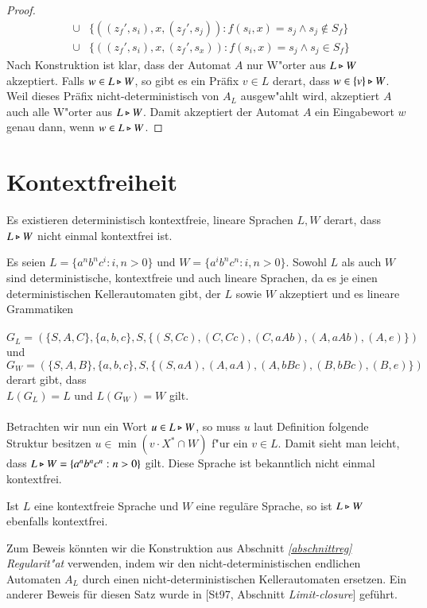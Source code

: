 \begin{proof}
\begin{eqnarray}
 & \cup & \{ ((z_f',s_i),x,(z_f',s_j)) : f(s_i,x)=s_j  \wedge s_j \notin S_f\} \label{auto3}\\
 & \cup & \{ ((z_f',s_i),x,(z_f',s_x)) : f(s_i,x)=s_j  \wedge s_j \in S_f \label{auto4} \}
\end{eqnarray}
Nach Konstruktion ist klar, dass der Automat $A$ nur W"orter aus $L\triangleright W$ akzeptiert. Falls $w\in L\triangleright W$, so gibt es ein Präfix $v\in L$ derart, dass $w\in \{v\}\triangleright W$. Weil dieses Präfix nicht-deterministisch von $A_L$ ausgew"ahlt wird, akzeptiert $A$ auch alle W"orter aus $L\triangleright W$.
Damit akzeptiert der Automat $A$ ein Eingabewort $w$ genau dann, wenn $w\in L\triangleright W$.
\end{proof}

\section{Kontextfreiheit}
Es existieren deterministisch kontextfreie, lineare Sprachen $L,W$ derart, dass $L\triangleright W$ nicht einmal kontextfrei ist.

\vspace{2ex}

\begin{beispiel}
Es seien $L=\{a^nb^nc^i:i,n>0\}$ und $W=\{a^ib^nc^n:i,n>0\}$. Sowohl $L$ als auch $W$ sind deterministische, kontextfreie und auch lineare Sprachen, da es je einen deterministischen Kellerautomaten gibt, der $L$ sowie $W$ akzeptiert und es lineare Grammatiken \\\\$G_L = (\{S,A,C\},\{a,b,c\},S,\{ (S,Cc),(C,Cc),(C,aAb),(A,aAb),(A,e)\})$ und \\$G_W = (\{S,A,B\},\{a,b,c\},S,\{ (S,aA),(A,aA),(A,bBc),(B,bBc),(B,e) \})$ derart gibt, dass \\$L(G_L) = L$ und $L(G_W) = W$ gilt.\\\\
Betrachten wir nun ein Wort $u\in L\triangleright W$, so muss $u$ laut Definition folgende Struktur besitzen $u\in \min( v\cdot X^* \cap W)$ f"ur ein $v \in L$.
Damit sieht man leicht, dass $L\triangleright W= \{a^nb^nc^n:n>0\}$ gilt. Diese Sprache ist bekanntlich nicht einmal kontextfrei.
\end{beispiel}

\vspace{2ex}

\begin{satz}
Ist $L$ eine kontextfreie Sprache und $W$ eine reguläre Sprache, so ist $L\triangleright W$ ebenfalls kontextfrei.
\end{satz}
Zum Beweis könnten wir die Konstruktion aus Abschnitt \emph{\ref{abschnittreg} Regularit"at} verwenden, indem wir den nicht-deterministischen endlichen Automaten $A_L$ durch einen nicht-deterministischen Kellerautomaten ersetzen.
Ein anderer Beweis für diesen Satz wurde in [St97, Abschnitt \emph{Limit-closure}] geführt.
\newpage
